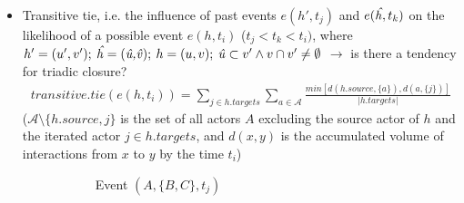 \begin{itemize}
\begin{itemize}
		\item Transitive tie, i.e. the influence of past events $e(h',t_j)$ and $e(\text{\emph{\^h}},t_k)$ on the likelihood of a possible event $e(h,t_i)$ ($t_j < t_k < t_i)$, where $h' = (u',v'); \: \text{\emph{\^h}} = (\text{\emph{\^u,\^v}}); \: h = (u,v); \: \text{\emph{\^u}} \subset v' \land v \cap v' \neq \emptyset$ $\rightarrow$ is there a tendency for triadic closure?
		\begin{align*}
			transitive.tie(e(h,t_i)) = \sum_{j \in h.targets} \sum_{a \in \mathcal{A}} \frac{min[d(h.source,\{a\}),d(a,\{j\})]}{\lvert h.targets \rvert}
		\end{align*}
		($\mathcal{A} \setminus \{h.source,j\}$ is the set of all actors $A$ excluding the source actor of $h$ and the iterated actor $j \in h.targets$, and $d(x,y)$ is the accumulated volume of interactions from $x$ to $y$ by the time $t_i$)
		\begin{figure}
			\begin{mdframed}
				\centering
				\begin{subfigure}[t]{0.3\linewidth}
					\vskip 0pt
					\caption{Event $(A,\{B,C\},t_j)$}
				\end{subfigure}
				\hfill
				\begin{subfigure}[t]{0.3\linewidth}
					\vskip 0pt
\end{subfigure}
\end{mdframed}
\end{figure}
\end{itemize}
\end{itemize}

